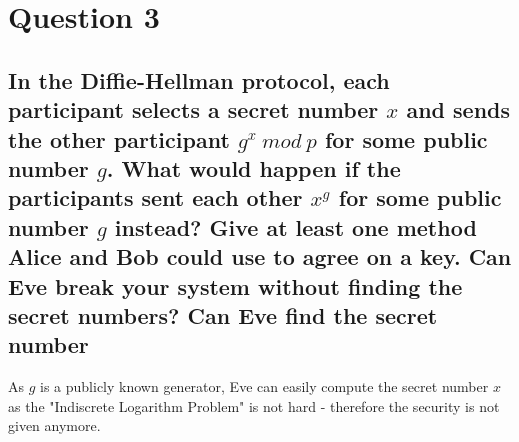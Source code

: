 \documentclass{report}
\begin{document}
	\section{Question 3}
	\startsection
		\renewcommand{\thesubsection}{\thesection.\Alph{subsection}}
		\subsection{In the Diffie-Hellman protocol, each participant selects a secret number $x$ and sends the other participant $g^x \ mod \ p$ for some public number $g$. What would happen if the participants sent each other $x^g$ for some public number $g$ instead? Give at least one method Alice and Bob could use to agree on a key. Can Eve break your system without finding the secret numbers? Can Eve find the secret number}
		\startsubsection
			As $g$ is a publicly known generator, Eve can easily compute the secret number $x$ as the "Indiscrete Logarithm Problem" is not hard - therefore the security is not given anymore.
		\closesection
	\closesection
\end{document}

